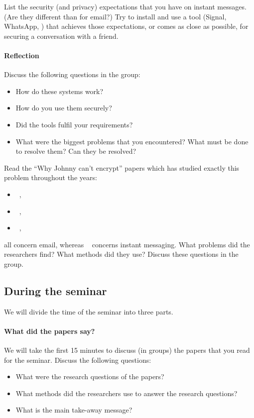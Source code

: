 List the security (and privacy) expectations that you have on instant messages.
(Are they different than for email?)
Try to install and use a tool (\eg Signal, WhatsApp, \etc) that achieves those 
expectations, or comes as close as possible, for securing a conversation with a 
friend.

\paragraph{Reflection}

Discuss the following questions in the group:
\begin{itemize}
  \item How do these systems work?
  \item How do you use them securely?
  \item Did the tools fulfil your requirements?
  \item What were the biggest problems that you encountered?
    What must be done to resolve them?
    Can they be resolved?
\end{itemize}

Read the \enquote{Why Johnny can't encrypt} papers which has studied exactly 
this problem throughout the years:
\begin{itemize}
  \item {}~\cite{WhyJohnnyCantEncrypt},
  \item {}~\cite{WhyJohnnyStillCantEncrypt},
  \item {}~\cite{WhyJohnnyStillStillCantEncrypt},
\end{itemize}
all concern email, whereas 
~\cite{CanJohnnyFinallyEncrypt} concerns 
instant messaging.
What problems did the researchers find?
What methods did they use?
Discuss these questions in the group.

\subsection{During the seminar}

We will divide the time of the seminar into three parts.

\paragraph{What did the papers say?}

We will take the first 15 minutes to discuss (in groups) the papers that you 
read for the seminar.
Discuss the following questions:
\begin{itemize}
  \item What were the research questions of the papers?
  \item What methods did the researchers use to answer the research questions?
  \item What is the main take-away message?
\end{itemize}

